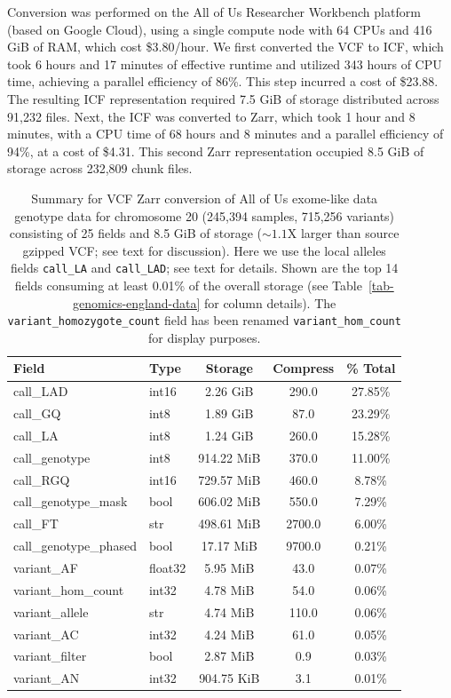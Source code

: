 \documentclass[a4paper,num-refs]{oup-contemporary}
\begin{document}
Conversion was performed on the All of Us Researcher Workbench platform
(based on Google Cloud), using a single compute node with 64 CPUs and 416 GiB
of RAM, which cost \$3.80/hour. We first converted the VCF to  ICF, which
took 6 hours and 17 minutes of effective runtime and utilized 343 hours of CPU
time, achieving a parallel efficiency of 86\%. This step incurred a cost of
\$23.88. The resulting ICF representation required 7.5 GiB of storage distributed
across 91,232 files. Next, the ICF was converted to Zarr, which took 1 hour and 8 minutes, with
a CPU time of 68 hours and 8 minutes and a parallel efficiency of 94\%, at a
cost of \$4.31. This second Zarr representation occupied 8.5 GiB of storage across
232,809 chunk files.

\begin{table}
\caption{Summary for VCF Zarr conversion of 
All of Us exome-like data genotype data for chromosome 20 (245,394 samples, 
715,256 variants) 
consisting of 25 fields and 8.5 GiB of storage ($\sim1.1$X larger
than source gzipped VCF; see text for discussion).
Here we use the local alleles fields \texttt{call\_LA} and \texttt{call\_LAD}; 
see text for details.
Shown are the top 14 fields consuming at least 0.01\% of the 
overall storage (see Table~\ref{tab-genomics-england-data} for column details).
The \texttt{variant\_homozygote\_count} field has been renamed 
\texttt{variant\_hom\_count} for display purposes.
\label{tab-aou-data}}
\begin{tabular}{llS[table-format=3.2]S[table-format=4.1]S[table-format=3.2]}
\toprule
{Field} & {Type} & {Storage} & {Compress} & {\% Total} \\
\midrule
call\_LAD & int16 & 2.26 GiB & 290.0 & 27.85\% \\
call\_GQ & int8 & 1.89 GiB & 87.0 & 23.29\% \\
call\_LA & int8 & 1.24 GiB & 260.0 & 15.28\% \\
call\_genotype & int8 & 914.22 MiB & 370.0 & 11.00\% \\
call\_RGQ & int16 & 729.57 MiB & 460.0 & 8.78\% \\
call\_genotype\_mask & bool & 606.02 MiB & 550.0 & 7.29\% \\
call\_FT & str & 498.61 MiB & 2700.0 & 6.00\% \\
call\_genotype\_phased & bool & 17.17 MiB & 9700.0 & 0.21\% \\
variant\_AF & float32 & 5.95 MiB & 43.0 & 0.07\% \\
variant\_hom\_count & int32 & 4.78 MiB & 54.0 & 0.06\% \\
variant\_allele & str & 4.74 MiB & 110.0 & 0.06\% \\
variant\_AC & int32 & 4.24 MiB & 61.0 & 0.05\% \\
variant\_filter & bool & 2.87 MiB & 0.9 & 0.03\% \\
variant\_AN & int32 & 904.75 KiB & 3.1 & 0.01\% \\
\bottomrule
\end{tabular}
\end{table}
\end{document}
